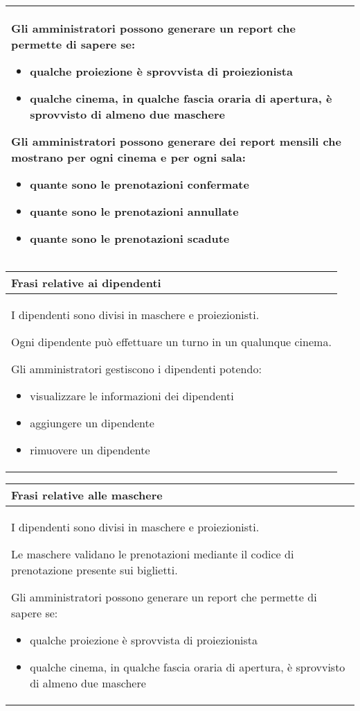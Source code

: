 \begin{tabularx}{\linewidth}{|X|}
      Gli amministratori possono generare un report che permette di
      sapere se:
      \begin{itemize}
            \item qualche proiezione è sprovvista di proiezionista
            \item qualche cinema, in qualche fascia oraria di apertura,
                  è sprovvisto di almeno due maschere
      \end{itemize}

      Gli amministratori possono generare dei report mensili che
      mostrano per ogni cinema e per ogni sala:
      \begin{itemize}
            \item quante sono le prenotazioni confermate
            \item quante sono le prenotazioni annullate
            \item quante sono le prenotazioni scadute
      \end{itemize}
      \\ \hline
\end{tabularx}

\begin{tabularx}{\linewidth}{|X|}
      \hline
      \rowcolor{tblhdrcolor}
      \textbf{Frasi relative ai dipendenti} \\\hline
      I dipendenti sono divisi in maschere e proiezionisti.

      Ogni dipendente può effettuare un turno in un qualunque cinema.

      Gli amministratori gestiscono i dipendenti potendo:
      \begin{itemize}
            \item visualizzare le informazioni dei dipendenti
            \item aggiungere un dipendente
            \item rimuovere un dipendente
      \end{itemize}
      \\ \hline
\end{tabularx}

\begin{tabularx}{\linewidth}{|X|}
      \hline
      \rowcolor{tblhdrcolor}
      \textbf{Frasi relative alle maschere} \\\hline
      I dipendenti sono divisi in maschere e proiezionisti.

      Le maschere validano le prenotazioni mediante il codice
      di prenotazione presente sui biglietti.

      Gli amministratori possono generare un report che permette di
      sapere se:
      \begin{itemize}
            \item qualche proiezione è sprovvista di proiezionista
            \item qualche cinema, in qualche fascia oraria di apertura,
                  è sprovvisto di almeno due maschere
      \end{itemize}
      \\ \hline
\end{tabularx}

